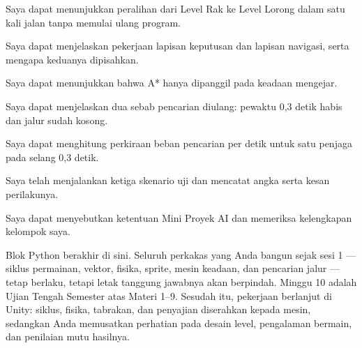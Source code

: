 
\begin{checklistbox}
\begin{checklist}
  \item Saya dapat menunjukkan peralihan dari Level Rak ke Level Lorong dalam
        satu kali jalan tanpa memulai ulang program.
  \item Saya dapat menjelaskan pekerjaan lapisan keputusan dan lapisan
        navigasi, serta mengapa keduanya dipisahkan.
  \item Saya dapat menunjukkan bahwa A* hanya dipanggil pada keadaan
        mengejar.
  \item Saya dapat menjelaskan dua sebab pencarian diulang: pewaktu 0,3 detik
        habis dan jalur sudah kosong.
  \item Saya dapat menghitung perkiraan beban pencarian per detik untuk satu
        penjaga pada selang 0,3 detik.
  \item Saya telah menjalankan ketiga skenario uji dan mencatat angka serta
        kesan perilakunya.
  \item Saya dapat menyebutkan ketentuan Mini Proyek AI dan memeriksa
        kelengkapan kelompok saya.
\end{checklist}
\end{checklistbox}


Blok Python berakhir di sini. Seluruh perkakas yang Anda bangun sejak sesi 1
--- siklus permainan, vektor, fisika, sprite, mesin keadaan, dan pencarian
jalur --- tetap berlaku, tetapi letak tanggung jawabnya akan berpindah.
Minggu 10 adalah Ujian Tengah Semester atas Materi 1--9. Sesudah itu,
pekerjaan berlanjut di Unity: siklus, fisika, tabrakan, dan penyajian
diserahkan kepada mesin, sedangkan Anda memusatkan perhatian pada desain
level, pengalaman bermain, dan penilaian mutu hasilnya.
